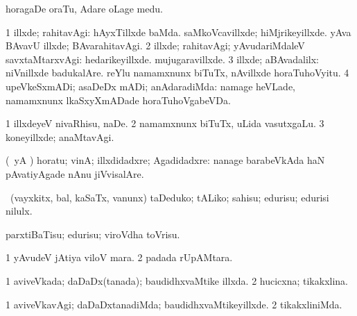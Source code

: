 {{{{{{\noindent
\gl{\pagu}
\expl{}
\bmng
{} horagaDe oraTu, Adare oLage medu. 
\emng
\eentry

\bentry
{} 
\gl{\upa}
\expl{}
\bmng
\bnum
\num{1} illxde; rahitavAgi:  hAyxTillxde baMda.  saMkoVcavillxde; hiMjrikeyillxde.  yAva BAvavU illxde; BAvarahitavAgi. 
\num{2} illxde; rahitavAgi; yAvudariMdaleV savxtaMtarxvAgi:  hedarikeyillxde.  mujugaravillxde. 
\num{3} illxde; aBAvadalilx:  niVnillxde badukalAre.  reYlu namamxnunx biTuTx, nAvillxde horaTuhoVyitu. 
\num{4} upeVkeSxmADi; asaDeDx mADi; anAdaradiMda:  namage heVLade, namamxnunx lkaSxyXmADade horaTuhoVgabeVDa. 
\enum
\emng

\noindent
\gl{\pagu}
\expl{}
\bmng
\bnum
\num{1}  illxdeyeV nivaRhisu, naDe. 
\num{2} namamxnunx biTuTx, uLida vasutxgaLu. 
\num{3}  koneyillxde; anaMtavAgi. 
\enum
\emng
\eentry

\bentry
{} 
\gl{\saMavayx}
\expl{}
\bmng
(\pArxparx\ yA \asaM)  horatu; vinA; illxdidadxre; Agadidadxre:  nanage barabeVkAda haN pAvatiyAgade nAnu jiVvisalAre. 
\emng
\eentry

\bentry
{} 
\gl{\kirx}
\bmng
 \sakirx\ (vayxkitx, bal, kaSaTx, \mo vanunx) taDeduko; tALiko; sahisu; edurisu; edurisi nilulx. 
\emng

\noindent
\gl{\akirx}
\expl{}
\bmng
parxtiBaTisu; edurisu; viroVdha toVrisu. 
\emng
\eentry

\bentry
{} 
\gl{\nA}
\bmng
\bnum
\num{1} yAvudeV jAtiya viloV mara. 
\num{2}  padada rUpAMtara. 
\enum
\emng
\eentry

\bentry
{} 
\gl{\gu}
\expl{}
\bmng
\bnum
\num{1} aviveVkada; daDaDx(tanada); baudidhxvaMtike illxda. 
\num{2} hucicxna; tikakxlina. 
\enum
\emng
\eentry

\bentry
{} 
\gl{\kirxvi}
\expl{}
\bmng
\bnum
\num{1} aviveVkavAgi; daDaDxtanadiMda; baudidhxvaMtikeyillxde. 
\num{2} tikakxliniMda. 
\enum
\emng
\eentry

}}}}}}
